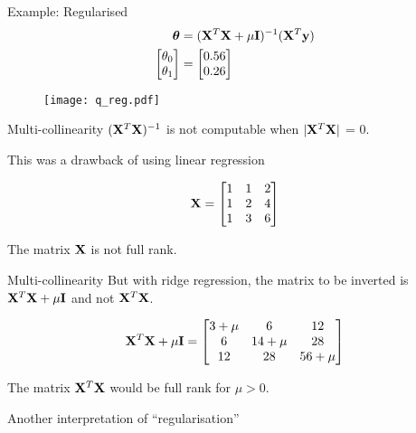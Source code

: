 \documentclass{beamer}
\begin{document}
\begin{frame}{Example: Regularised}
\vspace{0.4cm}
\begin{align*}
\begin{split}
\boldsymbol{\theta} &= (\mathbf{X}^{T}\mathbf{X}+\mu \mathbf{I})^{-1}(\mathbf{X}^{T}\mathbf{y}) \\
\begin{bmatrix}
\theta_{0}\\
\theta_{1}
\end{bmatrix} &= 
\begin{bmatrix}
0.56\\
0.26
\end{bmatrix} 
\end{split}
\end{align*}
\vspace{-0.8cm}
\begin{figure}
\texttt{[image: q\_reg.pdf]}
\end{figure}
\end{frame}

\begin{frame}{Multi-collinearity}
$(\mathbf{X}^{T}\mathbf{X})^{-1}$ is not computable when $|\mathbf{X}^{T}\mathbf{X}|$ = 0.

This was a drawback of using linear regression

\begin{equation*}
\mathbf{X} = \begin{bmatrix}
1 & 1& 2\\
1 & 2& 4\\
1 & 3& 6\\
\end{bmatrix}
\end{equation*}

The matrix $\mathbf{X}$ is not full rank. 
\end{frame}

\begin{frame}{Multi-collinearity}
But with ridge regression, the matrix to be inverted is $\mathbf{X}^{T}\mathbf{X} + \mu \mathbf{I}$ and not $\mathbf{X}^{T}\mathbf{X}$.

\begin{equation*}
\mathbf{X}^T\mathbf{X} + \mu \mathbf{I} = \begin{bmatrix}
3+\mu & 6& 12\\
6 & 14+\mu & 28\\
12 & 28& 56+\mu \\
\end{bmatrix}
\end{equation*}

The matrix $\mathbf{X}^T\mathbf{X}$ would be full rank for $\mu>0$. 

\pause Another interpretation of ``regularisation''
\end{frame}
\end{document}
